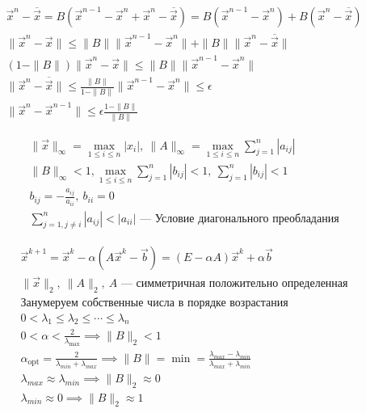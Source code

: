 \begin{note}
  \begin{gather*}
    \vec{x}^n - \overline{\vec{x}} = B (\vec{x}^{n - 1} - \vec{x}^n + \vec{x}^n
    - \overline{\vec{x}}) = B(\vec{x}^{n - 1} - \vec{x}^n) + B(\vec{x}^n -
    \overline{\vec{x}}) \\
    \|\vec{x}^n - \vec{x}\| \leq \|B\| \|\vec{x}^{n - 1} - \vec{x}^n\| + \|B\|
    \|\vec{x}^n - \overline{\vec{x}}\| \\
    (1 - \|B\|) \|\vec{x}^n - \vec{x}\| \leq \|B\| \| \vec{x}^{n -1} -
    \vec{x}^n\| \\
    \|\vec{x}^n - \overline{\vec{x}}\| \leq \frac{\|B\|}{1 - \|B\|} \|\vec{x}^{n
      - 1} - \vec{x}^n\| \leq \epsilon \\
    \|\vec{x}^n - \vec{x}^{n - 1}\| \leq \epsilon \frac{1 - \|B\|}{\|B\|}
  \end{gather*}
\end{note}

\begin{gather*}
  \|\vec{x}\|_\infty = \max_{1 \leq i \leq n} |x_i|,\ \|A\|_\infty = \max_{1
    \leq i \leq n} \sum_{j = 1}^n |a_{ij}| \\
  \|B\|_\infty < 1, \max_{1 \leq i \leq n} \sum_{j = 1}^n |b_{ij}| < 1,\ \sum_{j
    = 1}^n |b_{ij}| < 1 \\
  b_{ij} = - \frac{a_{ij}}{a_{ii}},\ b_{ii} = 0 \\
  \sum_{j = 1, j \neq i}^n |a_{ij}| < |a_{ii}| \text{ --- Условие диагонального преобладания}
\end{gather*}

\begin{gather*}
  \vec{x}^{k + 1} = \vec{x}^k - \alpha(A \vec{x}^k - \vec{b}) = (E - \alpha A)
  \vec{x}^k + \alpha \vec{b}\\
  \|\vec{x}\|_2,\ \|A\|_2,\ A \text{ --- симметричная положительно
    определенная}\\
  \text{Занумеруем собственные числа в порядке возрастания} \\
  0 < \lambda_1 \leq \lambda_2 \leq \cdots \leq \lambda_n \\
  0 < \alpha < \frac{2}{\lambda_{\text{max}}} \implies \|B\|_2 < 1 \\
  \alpha_{\text{opt}} = \frac{2}{\lambda_{min} + \lambda_{max}} \implies \|B\| =
  \min = \frac{\lambda_{max} - \lambda_{min}}{\lambda_{max} + \lambda_{min}} \\
  \lambda_{max} \approx \lambda_{min} \implies \|B\|_2 \approx 0 \\
  \lambda_{min} \approx 0 \implies \|B\|_2 \approx 1
\end{gather*}
